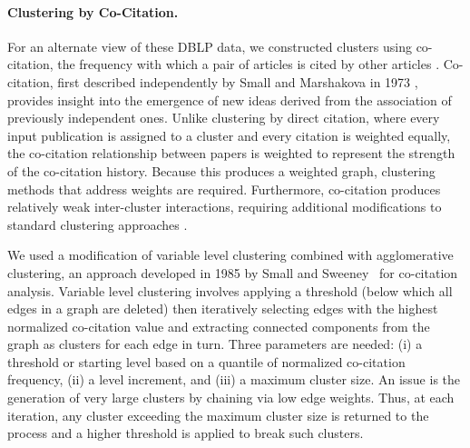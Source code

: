 \paragraph{Clustering by Co-Citation.}

For an alternate view of these DBLP data, we constructed clusters using co-citation, the frequency with which a pair of articles is cited by other articles \cite{small_co-citation_1973,marshakova-shaikevich_co-citation_1973}. %
Co-citation, first described independently by Small and Marshakova in 1973 \cite{marshakova-shaikevich_co-citation_1973}, provides insight into the emergence of new ideas derived from the association of previously independent ones. Unlike clustering by direct citation, where every input publication is assigned to a cluster and every citation is weighted equally, the co-citation relationship between papers is weighted to represent the strength of the co-citation history.
Because this produces a weighted graph, clustering methods that address weights are required.
Furthermore, co-citation produces relatively weak inter-cluster interactions, requiring additional modifications to standard clustering approaches \cite{boyack_cocitation_2010,boyack_improving_2013,small_structure_1974,small_clustering_1985}. 


We used a modification of variable level clustering combined with agglomerative clustering, an approach developed in 1985 by Small and Sweeney~\cite{small_clustering_1985} for co-citation analysis.
Variable level clustering involves applying a threshold (below which all edges in a graph are deleted) then iteratively selecting edges with the highest normalized co-citation value and extracting connected components from the graph as clusters for each edge in turn. Three parameters are needed: (i) a threshold or starting level based on a quantile of normalized co-citation frequency, (ii) a level increment, and (iii) a maximum cluster size. An issue is the generation of very large clusters by chaining via low edge weights.  Thus, at each iteration, any cluster exceeding the maximum cluster size  is returned to the process and a higher threshold is applied to break such clusters.

